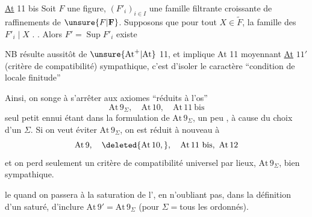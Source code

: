 \uline{At} 11 bis \quad Soit $F$ une figure, $(F'_i)_{i\in I}$ une famille filtrante croissante de raffinements de $\unsure{F|\mathbf{F}}$. Supposons que pour tout $X\in\widetilde F$, la famille des $F'_i\mid X$ . . Alors $F'=\operatorname{Sup} F'_i$ existe

NB \quad {} résulte aussitôt de \uline{$\unsure{\mathrm{At}^{+}|\mathrm{At}}$} 11, et  implique At 11 moyennant \uline{At} $11'$ (critère de compatibilité)    sympathique, c'est d'isoler le caractère ``condition de locale finitude''

Ainsi, on songe à s'arrêter aux axiomes ``réduits à l'os''
\[
\mathrm{At}\,9_{\Sigma},\quad \mathrm{At}\,10,\quad \mathrm{At}\,11\ \text{bis}
\]
 seul petit ennui étant dans la formulation de $\mathrm{At}\,9_{\Sigma}$, un peu , à cause du choix d'un $\Sigma$. Si on veut éviter $\mathrm{At}\,9_{\Sigma}$, on est réduit à nouveau à
\[
\mathrm{At}\,9,\quad \deleted{\mathrm{At}\,10,},\quad \mathrm{At}\,11\ \text{bis},\ \mathrm{At}\,12
\]
et on perd seulement un critère de compatibilité universel par lieux, $\mathrm{At}\,9_{\Sigma}$, bien sympathique.

  le  quand on passera à la saturation de l',  en n'oubliant pas, dans la définition d'un  saturé, d'inclure $\mathrm{At}\,9'=\mathrm{At}\,9_{\Sigma}$ (pour $\Sigma={}$tous les  ordonnés).
